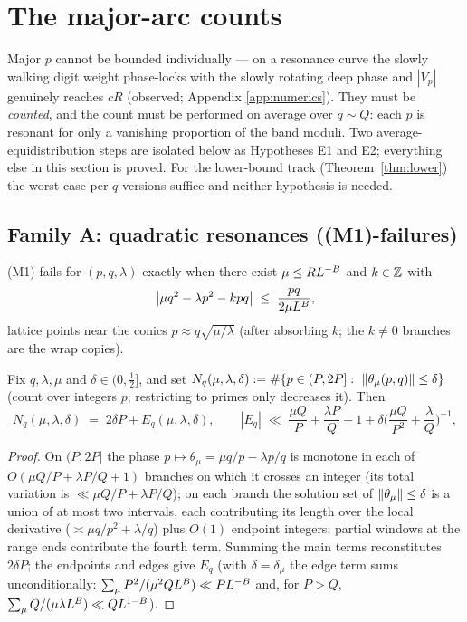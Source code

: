 \section{The major-arc counts}\label{sec:major}

Major $p$ cannot be bounded individually --- on a resonance curve the
slowly walking digit weight phase-locks with the slowly rotating deep
phase and $|V_p|$ genuinely reaches $cR$ (observed; Appendix
\ref{app:numerics}). They must be \emph{counted}, and the count must be
performed on average over $q\sim Q$: each $p$ is resonant for only a
vanishing proportion of the band moduli. Two average-equidistribution
steps are isolated below as Hypotheses E1 and E2; everything else in this
section is proved. For the lower-bound track
(Theorem~\ref{thm:lower}) the worst-case-per-$q$ versions suffice and
neither hypothesis is needed.

\subsection{Family A: quadratic resonances ((M1)-failures)}

(M1) fails for $(p,q,\lambda)$ exactly when there exist
$\mu\le RL^{-B}$ and $k\in\mathbb{Z}$ with
\begin{equation}\label{eq:conic}
\big|\mu q^2-\lambda p^2-kpq\big|\;\le\;\frac{pq}{2\mu L^{B}},
\end{equation}
lattice points near the conics $p\approx q\sqrt{\mu/\lambda}$ (after
absorbing $k$; the $k\ne0$ branches are the wrap copies).

\begin{lemma}\label{lem:branch}
\statusP\quad
Fix $q,\lambda,\mu$ and $\delta\in(0,\tfrac12]$, and set
$N_q(\mu,\lambda,\delta):=\#\{p\in(P,2P]:\ \nm{\theta_\mu(p,q)}\le\delta\}$
(count over integers $p$; restricting to primes only decreases it). Then
\[
N_q(\mu,\lambda,\delta)\;=\;2\delta P
+E_q(\mu,\lambda,\delta),
\qquad
|E_q|\;\ll\;\frac{\mu Q}{P}+\frac{\lambda P}{Q}+1
+\delta\Big(\frac{\mu Q}{P^{2}}+\frac{\lambda}{Q}\Big)^{-1},
\]
\end{lemma}

\begin{proof}
On $(P,2P]$ the phase $p\mapsto\theta_\mu=\mu q/p-\lambda p/q$ is
monotone in each of $O(\mu Q/P+\lambda P/Q+1)$ branches on which it
crosses an integer (its total variation is
$\ll\mu Q/P+\lambda P/Q$); on each branch the solution set of
$\left\| \theta_\mu\right\|\le\delta$ is a union of at most two intervals, each
contributing its length over the local derivative
($\asymp\mu q/p^2+\lambda/q$) plus $O(1)$ endpoint integers; partial
windows at the range ends contribute the fourth term. Summing the main
terms reconstitutes $2\delta P$; the endpoints and edges give $E_q$
(with $\delta=\delta_\mu$ the edge term sums unconditionally:
$\sum_\mu P^2/(\mu^2QL^B)\ll PL^{-B}$ and, for $P>Q$,
$\sum_\mu Q/(\mu\lambda L^B)\ll QL^{1-B}$).
\end{proof}

